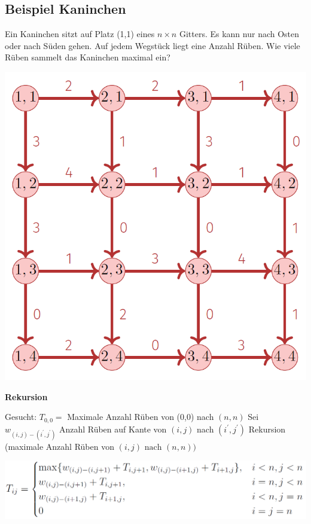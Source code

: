 \vspace{-4pt}
\begin{sectionbox}
\subsection{Beispiel Kaninchen}\smallskip
Ein Kaninchen sitzt auf Platz (1,1) eines $n \times n$ Gitters. Es kann nur nach Osten oder nach Süden gehen. Auf jedem Wegstück liegt eine Anzahl Rüben. Wie viele Rüben sammelt das Kaninchen maximal ein?\par\smallskip
\begin{center}
    \includegraphics[width = 0.75\columnwidth]{../img/kan1.png}
\end{center}\vspace{7px}

\textbf{Rekursion}\par
Gesucht: $T_{0,0}=$ Maximale Anzahl Rüben von (0,0) nach $(n, n)$ Sei $w_{(i, j)-\left(i^{\prime}, j^{\prime}\right)}$ Anzahl Rüben auf Kante von $(i, j)$ nach $\left(i^{\prime}, j^{\prime}\right)$ Rekursion (maximale Anzahl Rüben von $(i, j) \text { nach }(n, n))$\par\smallskip
\begin{center}
    \includegraphics[width = \columnwidth]{../img/kanRek.png}
\end{center}\vspace{7px}


\end{sectionbox}
